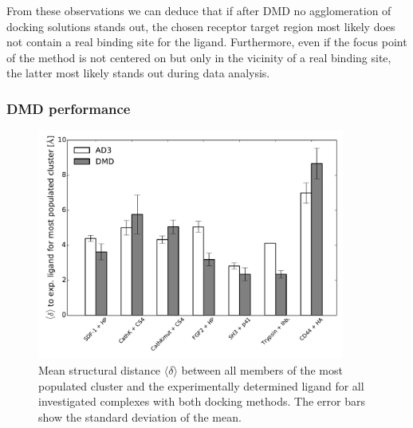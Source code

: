 From these observations we can deduce that if after DMD no agglomeration of
docking solutions stands out, the chosen receptor target region most likely does
not contain a real binding site for the ligand. Furthermore, even if the focus
point of the method is not centered on but only in the vicinity of a real
binding site, the latter most likely stands out during data analysis.

\subsubsection{DMD performance}

\begin{figure}
\centering
\includegraphics[width=0.9\textwidth]{gfx/dmd/figure_4_clustering_dmd_vs_ad3_plots_pub_004.pdf}
\caption[]{
Mean structural distance $\langle \delta \rangle$ between all members of the
most populated cluster and the experimentally determined ligand for all
investigated complexes with both docking methods. The error bars show the
standard deviation of the mean.
}
\label{fig:dmd:clus_dmd_vs_ad3}
\end{figure}



